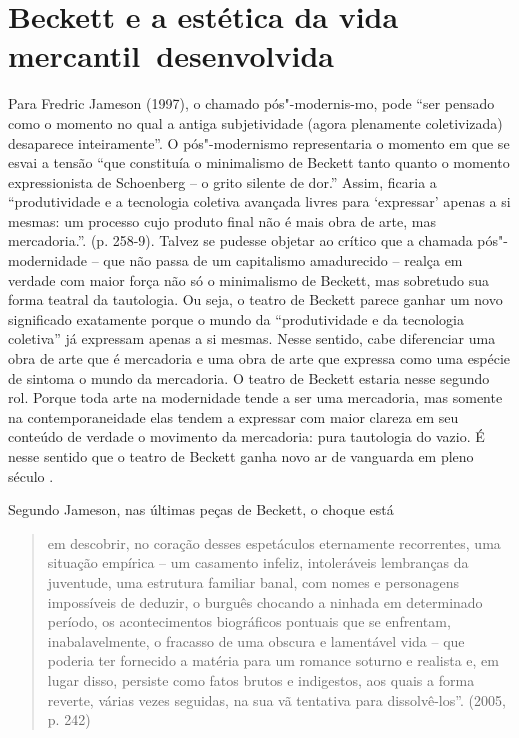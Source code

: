{\section{Beckett e a estética da vida mercantil~desenvolvida}

Para Fredric Jameson (1997), o chamado pós"-modernis-mo, pode ``ser %
pensado como o momento no qual a antiga subjetividade (agora plenamente
coletivizada) desaparece inteiramente''. O pós"-modernismo representaria
o momento em que se esvai a tensão ``que constituía o minimalismo de
Beckett tanto quanto o momento expressionista de Schoenberg -- o grito
silente de dor.'' Assim, ficaria a ``produtividade e a tecnologia
coletiva avançada livres para `expressar' apenas a si mesmas: um
processo cujo produto final não é mais obra de arte, mas mercadoria.''.
(p. 258-9). Talvez se pudesse objetar ao crítico que a chamada
pós"-modernidade -- que não passa de um capitalismo amadurecido -- realça
em verdade com maior força não só o minimalismo de Beckett, mas
sobretudo sua forma teatral da tautologia. Ou seja, o teatro de Beckett
parece ganhar um novo significado exatamente porque o mundo da
``produtividade e da tecnologia coletiva'' já expressam apenas a si
mesmas. Nesse sentido, cabe diferenciar uma obra de arte que é
mercadoria e uma obra de arte que expressa como uma espécie de sintoma o
mundo da mercadoria. O teatro de Beckett estaria nesse segundo rol.
Porque toda arte na modernidade tende a ser uma mercadoria, mas somente
na contemporaneidade elas tendem a expressar com maior clareza em seu
conteúdo de verdade o movimento da mercadoria: pura tautologia do vazio.
É nesse sentido que o teatro de Beckett ganha novo ar de vanguarda em
pleno século .

Segundo Jameson, nas últimas peças de Beckett, o choque está

\begin{quote}
em descobrir, no coração desses espetáculos eternamente recorrentes, uma
situação empírica -- um casamento infeliz, intoleráveis lembranças da
juventude, uma estrutura familiar banal, com nomes e personagens
impossíveis de deduzir, o burguês chocando a ninhada em determinado
período, os acontecimentos biográficos pontuais que se enfrentam,
inabalavelmente, o fracasso de uma obscura e lamentável vida -- que
poderia ter fornecido a matéria para um romance soturno e realista e, em
lugar disso, persiste como fatos brutos e indigestos, aos quais a forma
reverte, várias vezes seguidas, na sua vã tentativa para dissolvê-los''.
(2005, p. 242)
\end{quote}

}

